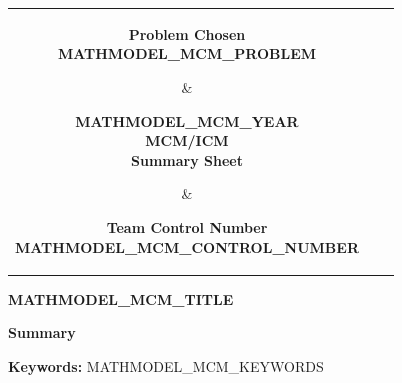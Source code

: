 \documentclass[12pt,letterpaper]{article}
\newcommand{\TeamNumber}{MATHMODEL_MCM_CONTROL_NUMBER}
\newcommand{\ProblemChosen}{MATHMODEL_MCM_PROBLEM}
\newcommand{\ContestYear}{MATHMODEL_MCM_YEAR}
\begin{document}
\thispagestyle{fancy}
\begin{center}
\begin{tabular}{*3{c}}
  \parbox[t]{0.3\linewidth}{\centering\textbf{Problem Chosen}\\[2pt]{\Large\textbf{\ProblemChosen}}}
  & \parbox[t]{0.3\linewidth}{\centering\textbf{\ContestYear\\MCM/ICM\\Summary Sheet}}
  & \parbox[t]{0.3\linewidth}{\centering\textbf{Team Control Number}\\[2pt]{\Large\textbf{\TeamNumber}}}\\
  \hline
\end{tabular}

\vspace{0.6em}
{\Large\textbf{MATHMODEL_MCM_TITLE}}
\end{center}

\begin{center}\textbf{\large Summary}\end{center}
\par
\par\vspace{0.5em}
\noindent\textbf{Keywords:} MATHMODEL_MCM_KEYWORDS

\clearpage

\tableofcontents
\clearpage








\clearpage
\end{document}
